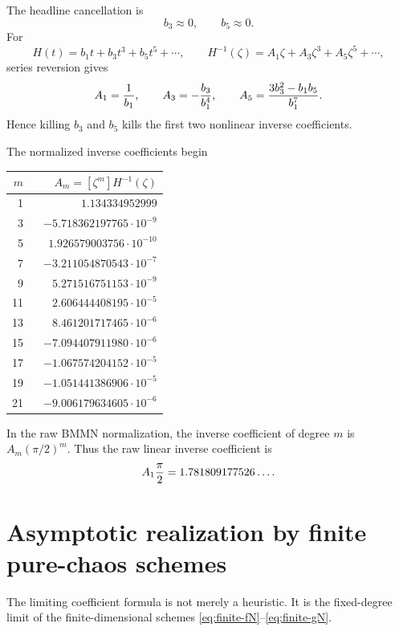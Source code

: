 \documentclass[11pt]{article}
\newcommand{\1}{\mathbf{1}}
\begin{document}
The headline cancellation is
\[
        b_3\approx0,
        \qquad b_5\approx0.
\]
For
\[
        H(t)=b_1t+b_3t^3+b_5t^5+\cdots,
        \qquad
        H^{-1}(\zeta)=A_1\zeta+A_3\zeta^3+A_5\zeta^5+\cdots,
\]
series reversion gives
\begin{equation}\label{eq:inverse-low}
        A_1={1\over b_1},
        \qquad
        A_3=-{b_3\over b_1^4},
        \qquad
        A_5={3b_3^2-b_1b_5\over b_1^7}.
\end{equation}
Hence killing \(b_3\) and \(b_5\) kills the first two nonlinear inverse coefficients.

The normalized inverse coefficients begin
\begin{center}
\begin{tabular}{r r}
\toprule
\(m\) & \(A_m=[\zeta^m]H^{-1}(\zeta)\) \\
\midrule
1  & \(\phantom{-}1.134334952999\) \\
3  & \(-5.718362197765\cdot10^{-9}\) \\
5  & \(\phantom{-}1.926579003756\cdot10^{-10}\) \\
7  & \(-3.211054870543\cdot10^{-7}\) \\
9  & \(\phantom{-}5.271516751153\cdot10^{-9}\) \\
11 & \(\phantom{-}2.606444408195\cdot10^{-5}\) \\
13 & \(\phantom{-}8.461201717465\cdot10^{-6}\) \\
15 & \(-7.094407911980\cdot10^{-6}\) \\
17 & \(-1.067574204152\cdot10^{-5}\) \\
19 & \(-1.051441386906\cdot10^{-5}\) \\
21 & \(-9.006179634605\cdot10^{-6}\) \\
\bottomrule
\end{tabular}
\end{center}

In the raw BMMN normalization, the inverse coefficient of degree \(m\) is \(A_m(\pi/2)^m\).  Thus the raw linear inverse coefficient is
\[
        A_1{\pi\over2}=1.781809177526\ldots.
\]

\section{Asymptotic realization by finite pure-chaos schemes}

The limiting coefficient formula is not merely a heuristic.  It is the fixed-degree limit of the finite-dimensional schemes \eqref{eq:finite-fN}--\eqref{eq:finite-gN}.
\end{document}
